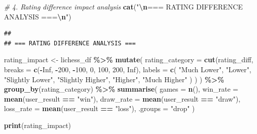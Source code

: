\documentclass[
]{article}
\newenvironment{Shaded}{\begin{snugshade}}{\end{snugshade}}
\newcommand{\AttributeTok}[1]{\textcolor[rgb]{0.13,0.29,0.53}{#1}}
\newcommand{\CommentTok}[1]{\textcolor[rgb]{0.56,0.35,0.01}{\textit{#1}}}
\newcommand{\ConstantTok}[1]{\textcolor[rgb]{0.56,0.35,0.01}{#1}}
\newcommand{\DecValTok}[1]{\textcolor[rgb]{0.00,0.00,0.81}{#1}}
\newcommand{\FunctionTok}[1]{\textcolor[rgb]{0.13,0.29,0.53}{\textbf{#1}}}
\newcommand{\NormalTok}[1]{#1}
\newcommand{\OtherTok}[1]{\textcolor[rgb]{0.56,0.35,0.01}{#1}}
\newcommand{\SpecialCharTok}[1]{\textcolor[rgb]{0.81,0.36,0.00}{\textbf{#1}}}
\newcommand{\StringTok}[1]{\textcolor[rgb]{0.31,0.60,0.02}{#1}}
\begin{document}
\begin{Shaded}
\begin{Highlighting}[]
\CommentTok{\# 4. Rating difference impact analysis}
\FunctionTok{cat}\NormalTok{(}\StringTok{"}\SpecialCharTok{\textbackslash{}n}\StringTok{=== RATING DIFFERENCE ANALYSIS ===}\SpecialCharTok{\textbackslash{}n}\StringTok{"}\NormalTok{)}
\end{Highlighting}
\end{Shaded}

\begin{verbatim}
## 
## === RATING DIFFERENCE ANALYSIS ===
\end{verbatim}

\begin{Shaded}
\begin{Highlighting}[]
\NormalTok{rating\_impact }\OtherTok{\textless{}{-}}\NormalTok{ lichess\_df }\SpecialCharTok{\%\textgreater{}\%}
  \FunctionTok{mutate}\NormalTok{(}
    \AttributeTok{rating\_category =} \FunctionTok{cut}\NormalTok{(rating\_diff,}
      \AttributeTok{breaks =} \FunctionTok{c}\NormalTok{(}\SpecialCharTok{{-}}\ConstantTok{Inf}\NormalTok{, }\SpecialCharTok{{-}}\DecValTok{200}\NormalTok{, }\SpecialCharTok{{-}}\DecValTok{100}\NormalTok{, }\DecValTok{0}\NormalTok{, }\DecValTok{100}\NormalTok{, }\DecValTok{200}\NormalTok{, }\ConstantTok{Inf}\NormalTok{),}
      \AttributeTok{labels =} \FunctionTok{c}\NormalTok{(}
        \StringTok{"Much Lower"}\NormalTok{, }\StringTok{"Lower"}\NormalTok{, }\StringTok{"Slightly Lower"}\NormalTok{,}
        \StringTok{"Slightly Higher"}\NormalTok{, }\StringTok{"Higher"}\NormalTok{, }\StringTok{"Much Higher"}
\NormalTok{      )}
\NormalTok{    )}
\NormalTok{  ) }\SpecialCharTok{\%\textgreater{}\%}
  \FunctionTok{group\_by}\NormalTok{(rating\_category) }\SpecialCharTok{\%\textgreater{}\%}
  \FunctionTok{summarise}\NormalTok{(}
    \AttributeTok{games =} \FunctionTok{n}\NormalTok{(),}
    \AttributeTok{win\_rate =} \FunctionTok{mean}\NormalTok{(user\_result }\SpecialCharTok{==} \StringTok{"win"}\NormalTok{),}
    \AttributeTok{draw\_rate =} \FunctionTok{mean}\NormalTok{(user\_result }\SpecialCharTok{==} \StringTok{"draw"}\NormalTok{),}
    \AttributeTok{loss\_rate =} \FunctionTok{mean}\NormalTok{(user\_result }\SpecialCharTok{==} \StringTok{"loss"}\NormalTok{),}
    \AttributeTok{.groups =} \StringTok{"drop"}
\NormalTok{  )}

\FunctionTok{print}\NormalTok{(rating\_impact)}
\end{Highlighting}
\end{Shaded}
\end{document}
